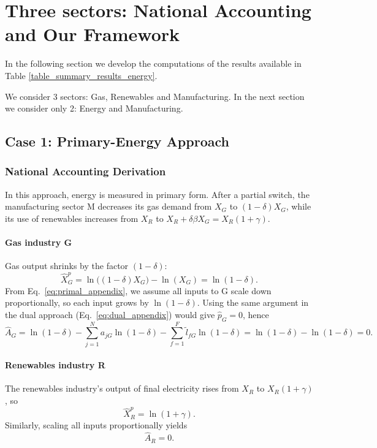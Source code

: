 \documentclass[11pt]{article}
\begin{document}
\newpage





\section{Three sectors: National Accounting and Our Framework}


In the following section we develop the computations of the results available in Table \ref{table_summary_results_energy}. 

We consider 3 sectors: Gas, Renewables and Manufacturing. In the next section we consider only 2: Energy and Manufacturing.

\subsection{Case 1: Primary-Energy Approach}
\label{subappendix_primary_energy}
\subsubsection{National Accounting Derivation}

In this approach, energy is measured in primary form. After a partial switch, the manufacturing sector M decreases its gas demand from $X_G$ to $(1-\delta)X_G$, while its use of renewables increases from $X_R$ to $X_R + \delta \beta X_G = X_R(1+\gamma)$.

\paragraph{Gas industry G}
Gas output shrinks by the factor $(1-\delta)$:
\[
    \hat{X}_G^p
= \ln\bigl((1-\delta) X_G\bigr)  -  \ln(X_G)
= \ln(1-\delta).
\]
From Eq.~\ref{eq:primal_appendix}, we assume all inputs to G scale down proportionally, so each input grows by $\ln(1-\delta)$. Using the same argument in the dual approach (Eq.~\ref{eq:dual_appendix}) would give $\hat{p}_G=0$, hence
\[
    \hat{A}_G
= \ln(1-\delta)
  - \sum_{j=1}^N a_{jG}\ln(1-\delta)
  - \sum_{f=1}^F \tilde{l}_{fG}\ln(1-\delta)
= \ln(1-\delta)  -  \ln(1-\delta)
= 0.
\]

\paragraph{Renewables industry R}
The renewables industry's output of final electricity rises from $X_R$ to $X_R(1+\gamma)$, so
\[
    \hat{X}_R^p
= \ln(1+\gamma).
\]
Similarly, scaling all inputs proportionally yields
\[
    \hat{A}_R = 0.
\]
\end{document}
